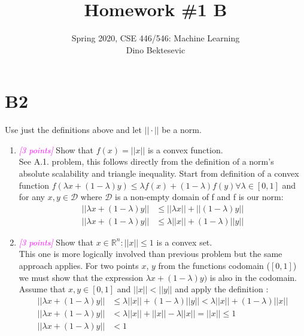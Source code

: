 \documentclass{article}
\date{{}}
\newcommand{\field}[1]{\mathbb{#1}}
\newcommand{\1}{\mathbf{1}}
\newcommand{\R}{\field{R}} %
\newcommand{\points}[1]{\small\textcolor{magenta}{\emph{[#1 points]}} \normalsize}
\begin{document}
\title{Homework \#1 B}
\author{\normalsize{Spring 2020, CSE 446/546: Machine Learning}\\
\normalsize{Dino Bektesevic}}
\maketitle

\section*{B2}
Use just the definitions above and let $||\cdot||$ be a norm.
\begin{enumerate}
    \item \points{3} Show that $f(x)=||x||$ is a convex function. \\
    See A.1. problem, this follows directly from the definition of a norm's absolute scalability and triangle inequality. Start from definition of a convex function $f(\lambda x + (1-\lambda)y) \leq \lambda f(x) + (1-\lambda)f(y) \forall\lambda\in[0,1]$ and for any $x,y\in\mathcal{D}$ where $\mathcal{D}$ is a non-empty domain of f and f is our norm:
    \begin{align*}
        ||\lambda x + (1-\lambda)y|| &\leq ||\lambda x|| + ||(1-\lambda)y|| \\
        ||\lambda x + (1-\lambda)y|| &\leq \lambda ||x|| + (1-\lambda)||y||
    \end{align*}
    
    \item \points{3} Show that ${x\in\R^n : ||x||\leq 1}$ is a convex set. \\
    This one is more logically involved than previous problem but the same approach applies. For two points $x$, $y$ from the functions codomain ($[0,1]$) we must show that the expression $\lambda x + (1-\lambda)y)$ is also in the codomain. Assume that $x,y \in [0,1]$ and $||x||<||y||$ and apply the definition : 
    \begin{align*}
        ||\lambda x + (1-\lambda)y|| &\leq  \lambda ||x|| + (1-\lambda)||y|| <  \lambda ||x|| + (1-\lambda)||x|| \\
        ||\lambda x + (1-\lambda)y|| &< \lambda ||x|| + ||x||-\lambda||x|| = ||x|| \leq 1\\
        ||\lambda x + (1-\lambda)y|| &< 1 
    \end{align*}
    

\end{enumerate}
\end{document}
